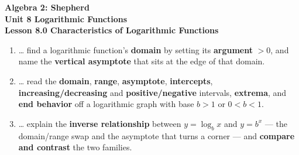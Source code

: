 \documentclass[10pt]{article}
\begin{document}
\vspace{-0.8in}

\begin{center}
  {\color{white}\textbf{\LARGE Algebra 2: Shepherd}}\\[4pt]
  {\color{forestmid}\large\textbf{Unit 8 \quad Logarithmic Functions}}\\[6pt]
  {\color{white}\textbf{\large Lesson 8.0 \quad Characteristics of Logarithmic Functions}}
\end{center}

\vspace{0.22in}
\namedateperiod
\vspace{0.18in}

\begin{learningtargetbox}
\small
\begin{enumerate}[leftmargin=1.5em, itemsep=5pt]
  \item \ldots{} find a logarithmic function's \textbf{domain} by setting its \textbf{argument} $>0$, and name the \textbf{vertical asymptote} that sits at the edge of that domain.
  \item \ldots{} read the \textbf{domain}, \textbf{range}, \textbf{asymptote}, \textbf{intercepts}, \textbf{increasing/decreasing} and \textbf{positive/negative} intervals, \textbf{extrema}, and \textbf{end behavior} off a logarithmic graph with base $b>1$ or $0<b<1$.
  \item \ldots{} explain the \textbf{inverse relationship} between $y=\log_b x$ and $y=b^x$ --- the domain/range swap and the asymptote that turns a corner --- and \textbf{compare and contrast} the two families.
\end{enumerate}
\end{learningtargetbox}

\vspace{0.14in}
\end{document}
